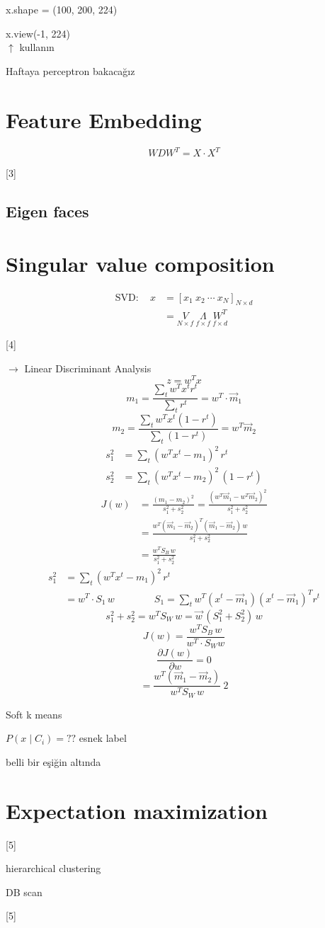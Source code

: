 \documentclass[11pt,a4paper]{article}
\begin{document}
x.shape = (100, 200, 224)

x.view(-1, 224)\\
$\uparrow$ kullanın

Haftaya perceptron bakacağız

\section{Feature Embedding}
\[ W D W^T = X \cdot X^T \]

[3]

\subsection{Eigen faces}

\section{Singular value composition}
\begin{align*}
\mathrm{SVD}:\quad x &= [x_1\ x_2\ \cdots\ x_N]_{N\times d} \\
&= \underset{N\times f}{V}\ \underset{f\times f}{\Lambda}\ \underset{f\times d}{W^T}
\end{align*}

[4]

$\rightarrow$ Linear Discriminant Analysis
\[ z = w^T x \]
\[ m_1 = \frac{\sum_t w^T x^t r^t}{\sum_t r^t} = w^T \cdot \vec{m}_1 \]
\[ m_2 = \frac{\sum_t w^T x^t (1 - r^t)}{\sum_t (1 - r^t)} = w^T \vec{m}_2 \]
\begin{align*}
s_1^2 &= \sum_t (w^T x^t - m_1)^2\, r^t \\
s_2^2 &= \sum_t (w^T x^t - m_2)^2\, (1 - r^t)
\end{align*}
\begin{align*}
J(w) &= \frac{(m_1 - m_2)^2}{s_1^2 + s_2^2} = \frac{(w^T \vec{m}_1 - w^T \vec{m}_2)^2}{s_1^2 + s_2^2} \\
&= \frac{w^T (\vec{m}_1 - \vec{m}_2)^T (\vec{m}_1 - \vec{m}_2)\, w}{s_1^2 + s_2^2} \\
&= \frac{w^T S_B\, w}{s_1^2 + s_2^2}
\end{align*}
\begin{align*}
s_1^2 &= \sum_t (w^T x^t - m_1)^2\, r^t \\
&= w^T \cdot S_1\, w \qquad\qquad S_1 = \sum_t w^T (x^t - \vec{m}_1)(x^t - \vec{m}_1)^T r^t
\end{align*}
\[ s_1^2 + s_2^2 = w^T S_W\, w = \vec{w}\,(S_1^2 + S_2^2)\, w \]
\[ J(w) = \frac{w^T S_B\, w}{w^T \cdot S_W w} \]
\[ \frac{\partial J(w)}{\partial w} = 0 \]
\[ {}= \frac{w^T (\vec{m}_1 - \vec{m}_2)}{w^T S_W\, w}\ 2 \]

Soft k means

$P(x \mid C_i) = ??$ \quad esnek label

belli bir eşiğin altında 

\section{Expectation maximization}
[5]

hierarchical clustering

DB scan

[5]
\end{document}
